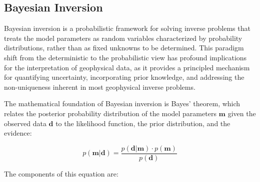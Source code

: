 \subsection{Bayesian Inversion}

Bayesian inversion is a probabilistic framework for solving inverse problems that treats the model parameters as random variables characterized by probability distributions, rather than as fixed unknowns to be determined. This paradigm shift from the deterministic to the probabilistic view has profound implications for the interpretation of geophysical data, as it provides a principled mechanism for quantifying uncertainty, incorporating prior knowledge, and addressing the non-uniqueness inherent in most geophysical inverse problems.

The mathematical foundation of Bayesian inversion is Bayes' theorem, which relates the posterior probability distribution of the model parameters $\mathbf{m}$ given the observed data $\mathbf{d}$ to the likelihood function, the prior distribution, and the evidence:

\begin{equation}
p(\mathbf{m} | \mathbf{d}) = \frac{p(\mathbf{d} | \mathbf{m}) \cdot p(\mathbf{m})}{p(\mathbf{d})}
\end{equation}

The components of this equation are:

